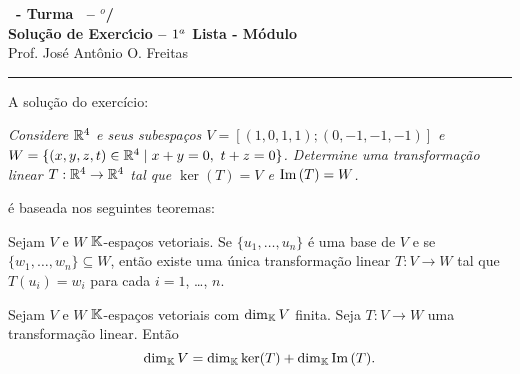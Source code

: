 \documentclass[12pt]{exam}
\begin{document}
    \begin{center}
        {\Large\bf \disciplina\ - Turma \turma\ -- \semestre$^{o}$/\ano} \\ \vspace{9pt} {\large\bf
            Solu\c{c}{\~a}o de Exerc{\'\i}cio -- $1^a$ Lista - M{\'o}dulo \numeromodulo}\\ \vspace{9pt} Prof. Jos{\'e} Ant{\^o}nio O. Freitas
    \end{center}
    \hrule

    A solu\c{c}\~ao do exerc\'icio:
    \begin{center}
        \begin{flushleft}
            \textit{Considere $\mathbb{R}^4$ e seus subespa\c{c}os $V = [(1,0,1,1);(0,-1,-1,-1)]$ e $W = \{(x,y,z,t) \in \mathbb{R}^4 \mid x + y = 0,\ t + z = 0\}$. Determine uma transforma\c{c}\~ao linear $T : \mathbb{R}^4 \to \mathbb{R}^4$ tal que $\ker(T) = V$ e ${\rm Im\,}(T) = W$.}
         \end{flushleft}
    \end{center}
    é baseada nos seguintes teoremas:

    \begin{tcolorbox}[colback=green!30, colframe=green!80!blue, title=Teorema]
        Sejam $V$ e $W$ $\mathbb{K}$-espa\c{c}os vetoriais. Se $\{u_1, \dots, u_n\}$ \'e uma base de $V$ e se $\{w_1, \dots, w_n\} \subseteq W$, ent\~ao existe uma \'unica transforma\c{c}\~ao linear $T \colon V \to W$ tal que $T(u_i) = w_i$ para cada $i = 1$, \dots, $n$.
    \end{tcolorbox}

    \begin{tcolorbox}[colback=green!30, colframe=green!80!blue, title=Teorema do Núcleo e da Imagem]
        Sejam $V$ e $W$ $\mathbb{K}$-espa\c{c}os vetoriais com $\dim_{\mathbb{K}}V$ finita. Seja $T : V \to W$ uma transforma\c{c}\~ao linear. Ent\~ao
        \[
        \dim_{\mathbb{K}}V = \dim_{\mathbb{K}}\ker(T) + \dim_{\mathbb{K}}{\rm Im\,}(T).
        \]
    \end{tcolorbox}
\end{document}
